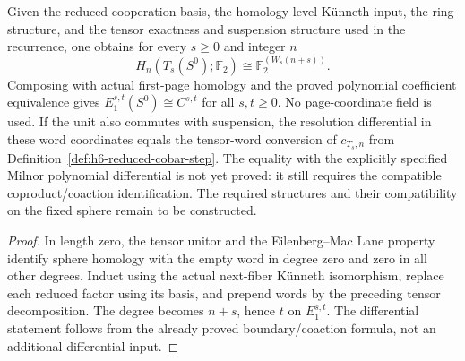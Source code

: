 \begin{proposition}
  \label{prop:h6-derived-milnor-coordinates}
  \leanok
  Given the reduced-cooperation basis, the homology-level K\"unneth input,
  the ring structure, and the tensor exactness and suspension structure
  used in the recurrence, one obtains for every $s\geq0$ and integer $n$
  \[
    H_n(T_s(S^0);\mathbb F_2)\cong\mathbb F_2^{(W_s(n+s))}.
  \]
  Composing with actual first-page homology and the proved polynomial
  coefficient equivalence gives $E_1^{s,t}(S^0)\cong C^{s,t}$ for all
  $s,t\geq0$. No page-coordinate field is used.
  If the unit also commutes with suspension, the resolution differential
  in these word coordinates equals the tensor-word conversion of
  $c_{T_s,n}$ from Definition~\ref{def:h6-reduced-cobar-step}.
  The equality with the explicitly specified Milnor polynomial
  differential is not yet proved: it still requires the compatible
  coproduct/coaction identification. The required structures and their
  compatibility on the fixed sphere remain to be constructed.
\end{proposition}
\begin{proof}
  In length zero, the tensor unitor and the Eilenberg--Mac Lane property
  identify sphere homology with the empty word in degree zero and zero
  in all other degrees. Induct using the actual next-fiber K\"unneth
  isomorphism, replace each reduced factor using its basis, and prepend
  words by the preceding tensor decomposition. The degree becomes
  $n+s$, hence $t$ on $E_1^{s,t}$. The differential statement follows
  from the already proved boundary/coaction formula, not an additional
  differential input.
  \leanok
\end{proof}

